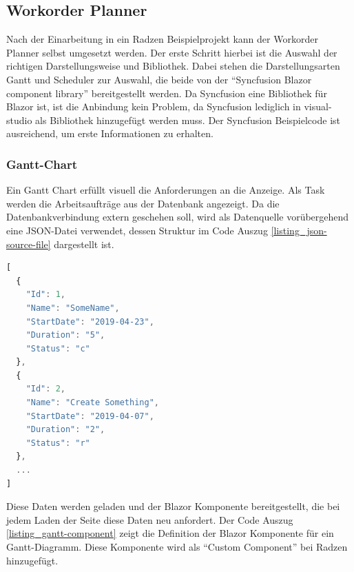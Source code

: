 \newpage
\subsection{Workorder Planner}
Nach der Einarbeitung in ein Radzen Beispielprojekt kann der Workorder Planner selbst umgesetzt werden. Der erste Schritt hierbei ist die Auswahl der richtigen Darstellungsweise und Bibliothek. Dabei stehen die Darstellungsarten Gantt und Scheduler zur Auswahl, die beide von der \enquote{Syncfusion Blazor
component library} bereitgestellt werden. Da Syncfusion eine Bibliothek für Blazor ist, ist die Anbindung kein Problem, da Syncfusion lediglich in \gls{visual-studio} als Bibliothek hinzugefügt werden muss. Der Syncfusion Beispielcode ist ausreichend, um erste Informationen zu erhalten.

\subsubsection{Gantt-Chart}
Ein Gantt Chart erfüllt visuell die Anforderungen an die Anzeige. Als Task werden die Arbeitsaufträge aus der Datenbank angezeigt. Da die Datenbankverbindung extern geschehen soll, wird als Datenquelle vorübergehend eine JSON-Datei verwendet, dessen Struktur im Code Auszug \ref{listing_json-source-file} dargestellt ist.

\begin{lstlisting}[language={JavaScript},
frame=single,
framexleftmargin=15pt,
style=algoBericht,
label={listing_json-source-file},
captionpos=b,
caption={Struktur der Quell-JSON-Datei}]
[
  {
    "Id": 1,
    "Name": "SomeName",
    "StartDate": "2019-04-23",
    "Duration": "5",
    "Status": "c"
  },
  {
    "Id": 2,
    "Name": "Create Something",
    "StartDate": "2019-04-07",
    "Duration": "2",
    "Status": "r"
  },
  ...
]
\end{lstlisting}

\newpage\noindent Diese Daten werden geladen und der Blazor Komponente bereitgestellt, die bei jedem Laden der Seite diese Daten neu anfordert. Der Code Auszug \ref{listing_gantt-component} zeigt die Definition der Blazor Komponente für ein Gantt-Diagramm. Diese Komponente wird als \enquote{Custom Component} bei Radzen hinzugefügt.


